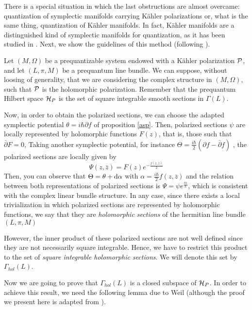 \documentclass[12pt]{article}
\theoremstyle{plain}
\def\dst{\(}
\def\d{{\rm d}}
\def\P{{\cal P}}
\def\H{{\cal H}}
\begin{document}
There is a special situation in which  the last obstructions are almost
overcame:
quantization of symplectic manifolds carrying K\"ahler polarizations
or, what is the same thing, quantization of K\"ahler manifolds.
In fact, K\"ahler manifolds are a distinguished kind of symplectic
manifolds
for quantization, as it has been studied in \cite{GS-gqmgr}.
Next, we show the guidelines of this method
(following \cite{Wo-80}).

Let $(M,\Omega )$ be a prequantizable system
endowed with a K\"ahler polarization $\P$,
and let $(L,\pi ,M)$ be a prequantum line bundle.
We can suppose, without loosing of generality, that
we are considering the complex structure in $(M,\Omega )$,
such that $\P$ is the holomorphic polarization.
Remember that the prequantum Hilbert space $\H_P$
is the set of square integrable smooth sections
in $\Gamma (L)$.

Now, in order to obtain the polarized sections,
we can choose the adapted symplectic potential
$\theta = i\hbar \partial f$ of proposition \ref{asp}.
Then, polarized sections $\psi$  are locally represented by holomorphic
functions
$F(z)$, that is, those such that $\bar \partial F = 0$,
Taking another symplectic potential, for instance
\dst\Theta = \frac{i\hbar}{2}(\partial f -\bar \partial f)\) ,
the polarized sections are locally given by
$$
\Psi (z,\bar z) = F(z) e^{-\frac{f(z,\bar z)}{2}}
$$
Then, you can observe that
$\Theta = \theta + \d \alpha$ with
\dst\alpha = \frac{i\hbar}{2}f(z,\bar z)\)
and the relation between both representations of polarized sections is
$\Psi = \psi e^{\frac{i\alpha}{\hbar}}$,
which is consistent with the complex linear bundle structure.
In any case, since there exists a local trivialization
in which polarized sections are represented by holomorphic functions,
we say that they are
{\it holomorphic sections} of the hermitian line bundle
$(L,\pi ,M)$

However, the inner product of these polarized sections
are not well defined since they are not necessarily
square integrable. Hence, we have to restrict this product to the set
of {\it square integrable holomorphic sections}.
We will denote this set by
$\Gamma_{hol}(L)$.

Now we are going to prove that
$\Gamma_{hol}(L)$ is a closed subspace of $\H_P$.
In order to achieve this result,
we need the following lemma due to Weil \cite{We-58}
(although the proof we present here is adapted from
\cite{Tu-gbkgq}).
\end{document}
